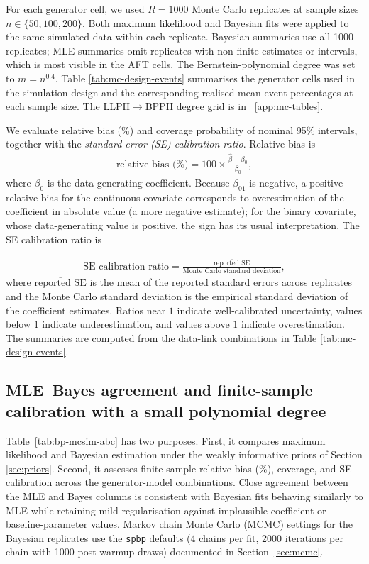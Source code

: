 \documentclass[5p,lefttitle]{elsarticle}
\begin{document}
{For each generator cell, we used \(R=1000\) Monte Carlo replicates at sample sizes \(n\in\{50,100,200\}\). Both maximum likelihood and Bayesian fits were applied to the same simulated data within each replicate. Bayesian summaries use all 1000 replicates; MLE summaries omit replicates with non-finite estimates or intervals, which is most visible in the AFT cells. The Bernstein-polynomial degree was set to \(m= n^{0.4} .\)
Table \ref{tab:mc-design-events} summarises the generator cells used in the simulation design and the corresponding realised mean event percentages at each sample size. The LLPH\(\to\)BPPH degree grid is in ~\ref{app:mc-tables}.

We evaluate relative bias (\%) and coverage probability
of nominal 95\% intervals, together with the \emph{standard error (SE)
calibration ratio}. Relative bias is
{\begin{align}\label{eqn:relbias}\text{relative bias (\%)}=100\times\frac{\hat\beta-\beta_0}{\beta_0},\end{align}\normalsize}
where \(\beta_0\) is the data-generating coefficient. Because $\beta_{01}$ is negative, a positive relative bias for the continuous
covariate corresponds to overestimation of the coefficient in absolute value
(a more negative estimate);
for the binary covariate, whose data-generating value is positive, the sign has
its usual interpretation. The SE calibration ratio is

{\footnotesize\begin{align}\text{SE calibration ratio}=\frac{\overline{\text{reported SE}}}{\text{Monte Carlo standard deviation}},\end{align}\normalsize}
where \(\overline{\text{reported SE}}\) is the mean of the reported
standard errors across replicates and the Monte Carlo standard deviation
is the empirical standard deviation of the coefficient estimates. Ratios
near \(1\) indicate well-calibrated uncertainty, values below \(1\) indicate
underestimation, and values above \(1\) indicate overestimation. The
summaries are computed from the data-link combinations in Table
\ref{tab:mc-design-events}.

\subsection{MLE--Bayes agreement and finite-sample calibration with a small polynomial degree}\label{sec:sim-results}

Table~\ref{tab:bp-mcsim-abc} has two purposes. First, it compares
maximum likelihood and Bayesian estimation under the weakly informative
priors of Section \ref{sec:priors}. Second, it assesses finite-sample
relative bias (\%), coverage, and SE calibration across the generator-model combinations.
Close agreement between the MLE and Bayes columns is consistent with
Bayesian fits behaving similarly to MLE while retaining mild
regularisation against implausible coefficient or baseline-parameter
values. Markov chain Monte Carlo (MCMC) settings for the Bayesian replicates use the
\texttt{spbp} defaults (4 chains per fit, 2000 iterations per chain with
1000 post-warmup draws) documented in Section~\ref{sec:mcmc}.

}
\end{document}
